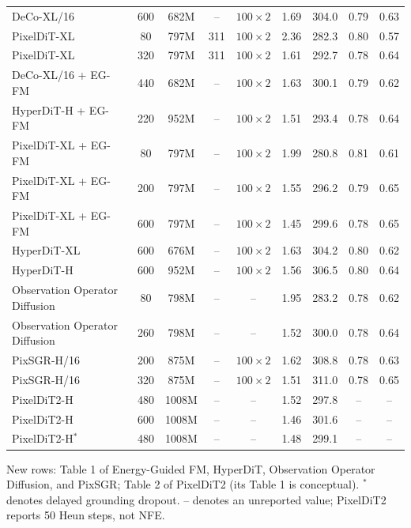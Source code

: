 \documentclass[10pt]{article}
\begin{document}
\begin{table}[!ht]
{\begin{tabular}{l c c c c c c c c}
            DeCo-XL/16 & 600 & 682M & -- & $100\times2$ & 1.69 & 304.0 & 0.79 & 0.63 \\
            PixelDiT-XL & 80 & 797M & 311 & $100\times2$ & 2.36 & 282.3 & 0.80 & 0.57 \\
            PixelDiT-XL & 320 & 797M & 311 & $100\times2$ & 1.61 & 292.7 & 0.78 & 0.64 \\
            \midrule
            DeCo-XL/16 + EG-FM & 440 & 682M & -- & $100\times2$ & 1.63 & 300.1 & 0.79 & 0.62 \\
            HyperDiT-H + EG-FM & 220 & 952M & -- & $100\times2$ & 1.51 & 293.4 & 0.78 & 0.64 \\
            PixelDiT-XL + EG-FM & 80 & 797M & -- & $100\times2$ & 1.99 & 280.8 & 0.81 & 0.61 \\
            PixelDiT-XL + EG-FM & 200 & 797M & -- & $100\times2$ & 1.55 & 296.2 & 0.79 & 0.65 \\
            PixelDiT-XL + EG-FM & 600 & 797M & -- & $100\times2$ & 1.45 & 299.6 & 0.78 & 0.65 \\
            HyperDiT-XL & 600 & 676M & -- & $100\times2$ & 1.63 & 304.2 & 0.80 & 0.62 \\
            HyperDiT-H & 600 & 952M & -- & $100\times2$ & 1.56 & 306.5 & 0.80 & 0.64 \\
            Observation Operator Diffusion & 80 & 798M & -- & -- & 1.95 & 283.2 & 0.78 & 0.62 \\
            Observation Operator Diffusion & 260 & 798M & -- & -- & 1.52 & 300.0 & 0.78 & 0.64 \\
            PixSGR-H/16 & 200 & 875M & -- & $100\times2$ & 1.62 & 308.8 & 0.78 & 0.63 \\
            PixSGR-H/16 & 320 & 875M & -- & $100\times2$ & 1.51 & 311.0 & 0.78 & 0.65 \\
            PixelDiT2-H & 480 & 1008M & -- & -- & 1.52 & 297.8 & -- & -- \\
            PixelDiT2-H & 600 & 1008M & -- & -- & 1.46 & 301.6 & -- & -- \\
            PixelDiT2-H$^{*}$ & 480 & 1008M & -- & -- & 1.48 & 299.1 & -- & -- \\
            \bottomrule
        \end{tabular}%
    }
    \par\smallskip\raggedright\scriptsize
    New rows: Table 1 of Energy-Guided FM, HyperDiT, Observation Operator Diffusion, and PixSGR; Table 2 of PixelDiT2 (its Table 1 is conceptual). $^{*}$ denotes delayed grounding dropout. -- denotes an unreported value; PixelDiT2 reports 50 Heun steps, not NFE.
\end{table}
\end{document}
